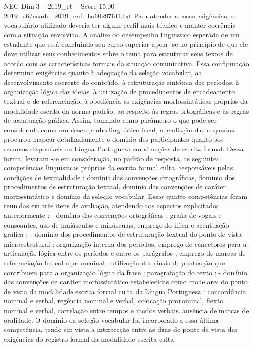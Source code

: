 \begin{textsample}{NEG Dim 3 – 2019\_c6 – Score 15.00 – 2019\_c6/enade\_2019\_enf\_ba60297fd1.txt}
Para atender a essas exigências, o vocabulário utilizado deveria ter algum perfil mais técnico e manter coerência com a situação envolvida.
A análise do desempenho linguístico esperado de um estudante que está concluindo seu curso superior apoia -se no princípio de que ele deve utilizar seus conhecimentos sobre o tema para estruturar seus textos de acordo com as características formais da situação comunicativa.
Essa configuração determina exigências quanto à adequação da seleção vocabular, ao desenvolvimento coerente do conteúdo, à estruturação sintática dos períodos, à organização lógica das ideias, à utilização de procedimentos de encadeamento textual e de referenciação, à obediência às exigências morfossintáticas próprias da modalidade escrita da norma-padrão, ao respeito às regras ortográficas e às regras de acentuação gráfica.
Assim, tomando como parâmetro o que pode ser considerado como um desempenho linguístico ideal, a avaliação das respostas procurou mapear detalhadamente o domínio dos participantes quanto aos recursos disponíveis na Língua Portuguesa em situações de escrita formal.
Dessa forma, levaram -se em consideração, no padrão de resposta, as seguintes competências linguísticas próprias da escrita formal culta, responsáveis pelas condições de textualidade : domínio das convenções ortográficas, domínio dos procedimentos de estruturação textual, domínio das convenções de caráter morfossintático e domínio da seleção vocabular.
Essas quatro competências foram reunidas em três itens de avaliação, atendendo aos aspectos explicitados anteriormente : - domínio das convenções ortográficas : grafia de vogais e consoantes, uso de maiúsculas e minúsculas, emprego do hífen e acentuação gráfica ; - domínio dos procedimentos de estruturação textual do ponto de vista microestrutural : organização interna dos períodos, emprego de conectores para a articulação lógica entre os períodos e entre os parágrafos ; emprego de marcas de referenciação lexical e pronominal ; utilização dos sinais de pontuação que contribuem para a organização lógica da frase ; paragrafação do texto ; - domínio das convenções de caráter morfossintático estabelecidas como modelares do ponto de vista da modalidade escrita formal culta da Língua Portuguesa : concordância nominal e verbal, regência nominal e verbal, colocação pronominal, flexão nominal e verbal, correlação entre tempos e modos verbais, ausência de marcas de oralidade.
O domínio da seleção vocabular foi incorporado a essa última competência, tendo em vista a intersecção entre as duas do ponto de vista das exigências do registro formal da modalidade escrita culta.

\end{textsample}
